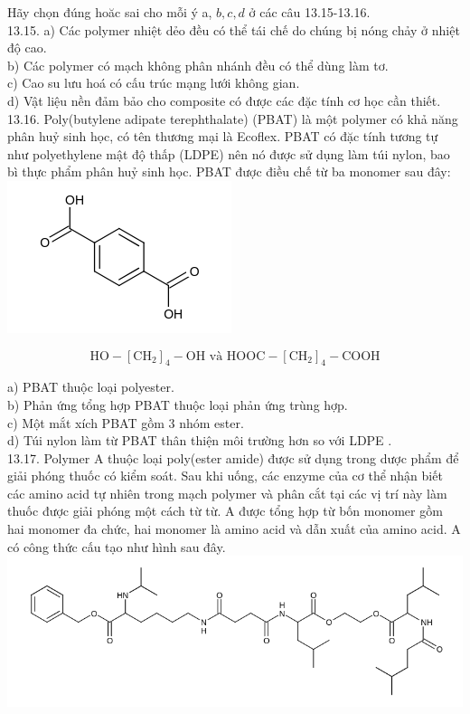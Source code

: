 \documentclass[10pt]{article}
\begin{document}
Hãy chọn đúng hoăc sai cho mỗi ý a, $b, c, d$ ở các câu 13.15-13.16.\\
13.15. a) Các polymer nhiệt dẻo đều có thể tái chế do chúng bị nóng chảy ở nhiệt độ cao.\\
b) Các polymer có mạch không phân nhánh đều có thể dùng làm tơ.\\
c) Cao su lưu hoá có cấu trúc mạng lưới không gian.\\
d) Vật liệu nền đảm bảo cho composite có được các đặc tính cơ học cần thiết.\\
13.16. Poly(butylene adipate terephthalate) (PBAT) là một polymer có khả năng phân huỷ sinh học, có tên thương mại là Ecoflex. PBAT có đặc tính tương tự như polyethylene mật độ thấp (LDPE) nên nó được sử dụng làm túi nylon, bao bì thực phẩm phân huỷ sinh học. PBAT được điều chế từ ba monomer sau đây:\\
\includegraphics{smile-91c82a8bf17aed5d23c7af2c1161766fb5014fec}

$$
\mathrm{HO}-\left[\mathrm{CH}_{2}\right]_{4}-\mathrm{OH} \text { và } \mathrm{HOOC}-\left[\mathrm{CH}_{2}\right]_{4}-\mathrm{COOH}
$$

a) PBAT thuộc loại polyester.\\
b) Phản ứng tổng hợp PBAT thuộc loại phản ứng trùng hợp.\\
c) Một mắt xích PBAT gồm 3 nhóm ester.\\
d) Túi nylon làm từ PBAT thân thiện môi trường hơn so với LDPE .\\
13.17. Polymer A thuộc loại poly(ester amide) được sử dụng trong dược phẩm để giải phóng thuốc có kiểm soát. Sau khi uống, các enzyme của cơ thể nhận biết các amino acid tự nhiên trong mạch polymer và phân cắt tại các vị trí này làm thuốc được giải phóng một cách từ từ. A được tổng hợp từ bốn monomer gồm hai monomer đa chức, hai monomer là amino acid và dẫn xuất của amino acid. A có công thức cấu tạo như hình sau đây.\\
\includegraphics{smile-7f6755c6e1c2022dd8df503bac03fd1ac082ea73}
\end{document}
